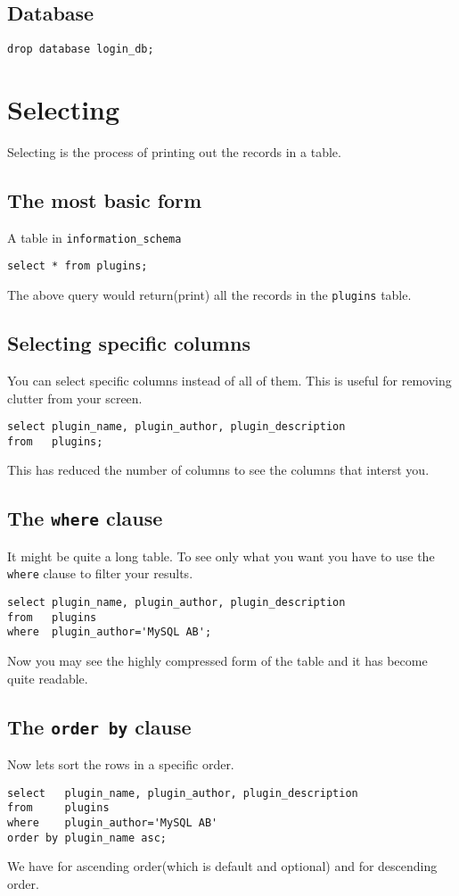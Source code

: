 \documentclass[11pt]{article}
\begin{document}
\subsection{Database}
\label{sec:orgfa9c8cb}
\begin{verbatim}
drop database login_db;
\end{verbatim}
\section{Selecting}
\label{sec:org7f80c30}
Selecting is the process of printing out the records in a table.
\subsection{The most basic form}
\label{sec:org847d696}
A table in \texttt{information\_schema}
\begin{verbatim}
select * from plugins;
\end{verbatim}
The above query would return(print) all the records in the \texttt{plugins} table.
\subsection{Selecting specific columns}
\label{sec:org0b22d93}
You can select specific columns instead of all of them. This is useful for
removing clutter from your screen.
\begin{verbatim}
select plugin_name, plugin_author, plugin_description
from   plugins;
\end{verbatim}
This has reduced the number of columns to see the columns that interst you.
\subsection{The \texttt{where} clause}
\label{sec:orgf47fdc7}
It might be quite a long table. To see only what you want you have to use the
\texttt{where} clause to filter your results.
\begin{verbatim}
select plugin_name, plugin_author, plugin_description
from   plugins
where  plugin_author='MySQL AB';
\end{verbatim}
Now you may see the highly compressed form of the table and it has become quite
readable.
\subsection{The \texttt{order by} clause}
\label{sec:org9ad1e89}
Now lets sort the rows in a specific order.
\begin{verbatim}
select   plugin_name, plugin_author, plugin_description
from     plugins
where    plugin_author='MySQL AB'
order by plugin_name asc;
\end{verbatim}
We have for ascending order(which is default and optional) and 
for descending order.
\end{document}
